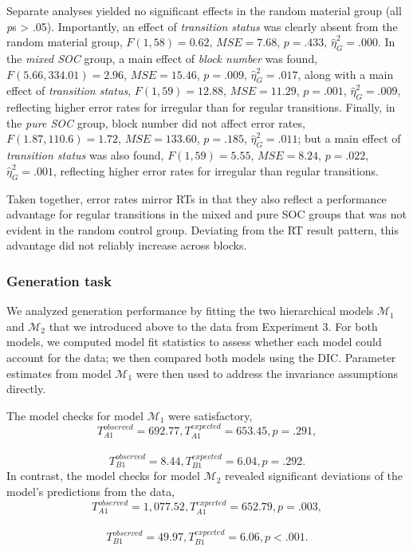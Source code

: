 \documentclass[man]{apa6}
\theoremstyle{definition}
\theoremstyle{definition}
\theoremstyle{definition}
\theoremstyle{remark}
\begin{document}
Separate analyses yielded no significant effects in the random material
group (all \emph{p}s \textgreater{} .05). Importantly, an effect of
\emph{transition status} was clearly absent from the random material
group, \(F(1, 58) = 0.62\), \(\mathit{MSE} = 7.68\), \(p = .433\),
\(\hat{\eta}^2_G = .000\). In the \emph{mixed SOC} group, a main effect
of \emph{block number} was found, \(F(5.66, 334.01) = 2.96\),
\(\mathit{MSE} = 15.46\), \(p = .009\), \(\hat{\eta}^2_G = .017\), along
with a main effect of \emph{transition status}, \(F(1, 59) = 12.88\),
\(\mathit{MSE} = 11.29\), \(p = .001\), \(\hat{\eta}^2_G = .009\),
reflecting higher error rates for irregular than for regular
transitions. Finally, in the \emph{pure SOC} group, block number did not
affect error rates, \(F(1.87, 110.6) = 1.72\),
\(\mathit{MSE} = 133.60\), \(p = .185\), \(\hat{\eta}^2_G = .011\); but
a main effect of \emph{transition status} was also found,
\(F(1, 59) = 5.55\), \(\mathit{MSE} = 8.24\), \(p = .022\),
\(\hat{\eta}^2_G = .001\), reflecting higher error rates for irregular
than regular transitions.

Taken together, error rates mirror RTs in that they also reflect a
performance advantage for regular transitions in the mixed and pure SOC
groups that was not evident in the random control group. Deviating from
the RT result pattern, this advantage did not reliably increase across
blocks.

\subsubsection{Generation task}\label{generation-task-2}

We analyzed generation performance by fitting the two hierarchical
models \(\mathcal{M}_1\) and \(\mathcal{M}_2\) that we introduced above
to the data from Experiment 3. For both models, we computed model fit
statistics to assess whether each model could account for the data; we
then compared both models using the DIC. Parameter estimates from model
\(\mathcal{M}_1\) were then used to address the invariance assumptions
directly.

The model checks for model \(\mathcal{M}_1\) were satisfactory,
\[T_{A1}^{observed} = 692.77, T_{A1}^{expected} = 653.45, p = .291,\]~
\[T_{B1}^{observed} = 8.44, T_{B1}^{expected} = 6.04, p = .292.\] In
contrast, the model checks for model \(\mathcal{M}_2\) revealed
significant deviations of the model's predictions from the data,
\[T_{A1}^{observed} = 1,077.52, T_{A1}^{expected} = 652.79, p = .003,\]~
\[T_{B1}^{observed} = 49.97, T_{B1}^{expected} = 6.06, p < .001.\]
\end{document}
